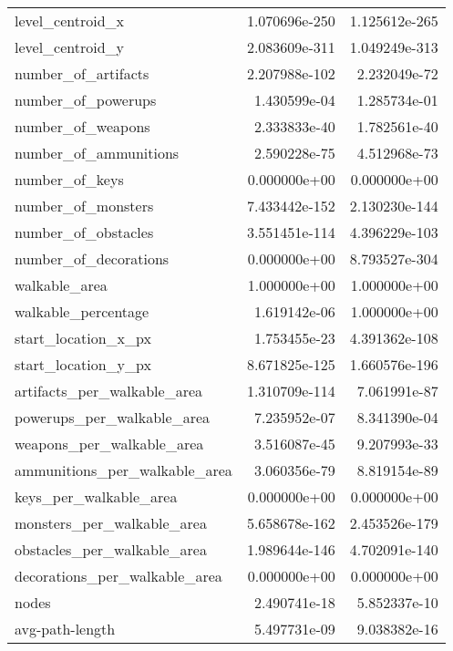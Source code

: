 \documentclass{report}
\begin{document}
\begin{longtable}{lrr}
	level\_centroid\_x              &  1.070696e-250 &  1.125612e-265 \\
	level\_centroid\_y              &  2.083609e-311 &  1.049249e-313 \\
	number\_of\_artifacts           &  2.207988e-102 &   2.232049e-72 \\
	number\_of\_powerups            &   1.430599e-04 &   1.285734e-01 \\
	number\_of\_weapons             &   2.333833e-40 &   1.782561e-40 \\
	number\_of\_ammunitions         &   2.590228e-75 &   4.512968e-73 \\
	number\_of\_keys                &   0.000000e+00 &   0.000000e+00 \\
	number\_of\_monsters            &  7.433442e-152 &  2.130230e-144 \\
	number\_of\_obstacles           &  3.551451e-114 &  4.396229e-103 \\
	number\_of\_decorations         &   0.000000e+00 &  8.793527e-304 \\
	walkable\_area                 &   1.000000e+00 &   1.000000e+00 \\
	walkable\_percentage           &   1.619142e-06 &   1.000000e+00 \\
	start\_location\_x\_px           &   1.753455e-23 &  4.391362e-108 \\
	start\_location\_y\_px           &  8.671825e-125 &  1.660576e-196 \\
	artifacts\_per\_walkable\_area   &  1.310709e-114 &   7.061991e-87 \\
	powerups\_per\_walkable\_area    &   7.235952e-07 &   8.341390e-04 \\
	weapons\_per\_walkable\_area     &   3.516087e-45 &   9.207993e-33 \\
	ammunitions\_per\_walkable\_area &   3.060356e-79 &   8.819154e-89 \\
	keys\_per\_walkable\_area        &   0.000000e+00 &   0.000000e+00 \\
	monsters\_per\_walkable\_area    &  5.658678e-162 &  2.453526e-179 \\
	obstacles\_per\_walkable\_area   &  1.989644e-146 &  4.702091e-140 \\
	decorations\_per\_walkable\_area &   0.000000e+00 &   0.000000e+00 \\
	nodes                         &   2.490741e-18 &   5.852337e-10 \\
	avg-path-length               &   5.497731e-09 &   9.038382e-16 \\

\end{longtable}
\end{document}
